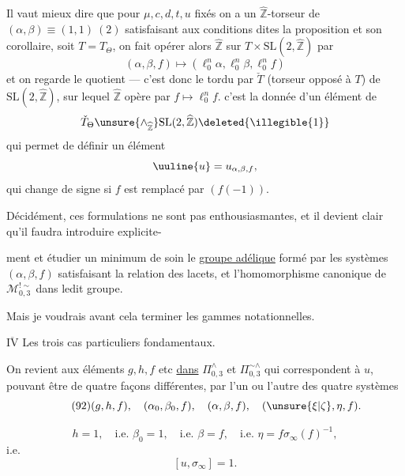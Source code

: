 Il vaut mieux dire que pour $\mu,c,d,t,u$ fixés on a un $\widehat{\mathbb Z}$-torseur de $(\alpha,\beta)\equiv(1,1)\ (2)$ satisfaisant aux conditions dites  la proposition  et son corollaire, soit $T=T_\Theta$, on fait opérer alors $\widehat{\mathbb Z}$  sur $T\times\mathrm{SL}(2,\widehat{\mathbb Z})$ par
\[
 (\alpha,\beta,f)\longmapsto
 (\ell_0^n\alpha,\ell_0^n\beta,\ell_0^n f)
\]
et on regarde le quotient --- c'est donc le tordu par $\check T$ (torseur opposé à $T$) de $\mathrm{SL}(2,\widehat{\mathbb Z})$, sur lequel $\widehat{\mathbb Z}$ opère par $f\longmapsto\ell_0^n f$.  c'est la donnée d'un élément  de
\[
 \check T_\Theta\unsure{\mathbin{\wedge}_{\widehat{\mathbb Z}}}\mathrm{SL}(2,\widehat{\mathbb Z})
 \deleted{\illegible{1}}
\]
qui permet de définir un élément
\[
 \uuline{u}=u_{\alpha,\beta,f},
\]
qui change de signe si $f$ est remplacé par $(f(-1))$.

Décidément, ces formulations ne sont pas enthousiasmantes, et il devient clair qu'il faudra introduire explicite-


ment et étudier  un minimum de soin le \uline{groupe adélique} formé par les systèmes $(\alpha,\beta,f)$ satisfaisant la relation des lacets, et  l'homomorphisme canonique de $\mathcal M_{0,3}^{!\sim}$ dans ledit groupe.

Mais je voudrais avant cela terminer les gammes notationnelles.



\uline{$\overline{\mathrm{IV}}$} Les trois cas particuliers fondamentaux.

On revient aux éléments $g,h,f$ etc \uline{dans} $\Pi_{0,3}^{\wedge}$ et $\Pi_{0,3}^{\sim\wedge}$ qui correspondent à $u$, pouvant être  de quatre façons différentes, par l'un ou l'autre des quatre systèmes
\[
\tag{92}
 (g,h,f),\quad(\alpha_0,\beta_0,f),\quad(\alpha,\beta,f),\quad(\unsure{\xi|\zeta},\eta,f).
\]

\[
\tag{93}
 h=1,\quad\text{i.e. }\beta_0=1,\quad\text{i.e. }\beta=f,\quad
 \text{i.e. }\eta=f\sigma_\infty(f)^{-1},
\]
i.e.
\[
\tag{94}
 [u,\sigma_\infty]=1.
\]

